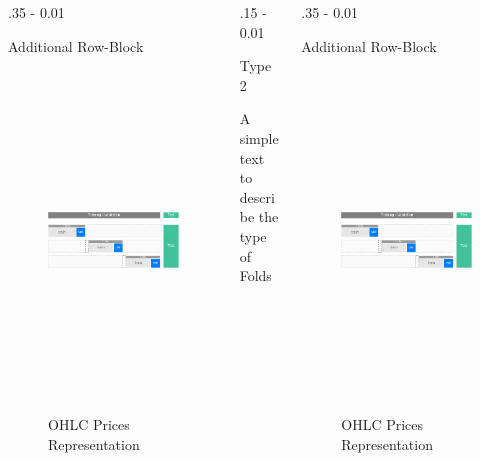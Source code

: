 \documentclass{postertheme}\usepackage[]{graphicx}\usepackage[]{color}
\begin{document}
\begin{frame}
\begin{columns}[onlytextwidth]
\begin{column}{.35 \textwidth - 0.01 \textwidth}
\begin{block}{Additional Row-Block}
      \begin{figure}
        \includegraphics[width=34cm, height=9cm,keepaspectratio=true]{figures/T-Fold-SV.png}
        \caption{\footnotesize OHLC Prices Representation}
      \end{figure}
        
    \end{block}
  \end{column}
  
  \begin{column}{.15 \textwidth - 0.01 \textwidth}
    \begin{block}{Type 2}
        
      A simple text to describe the type of Folds
        
    \end{block}
  \end{column}
  
  \begin{column}{.35 \textwidth - 0.01 \textwidth}
    \begin{block}{Additional Row-Block}
        
      \begin{figure}
        \includegraphics[width=34cm, height=9cm,keepaspectratio=true]{figures/T-Fold-SV.png}
        \caption{\footnotesize OHLC Prices Representation}
      \end{figure}
        

\end{block}
\end{column}
\end{columns}
\end{frame}
\end{document}

